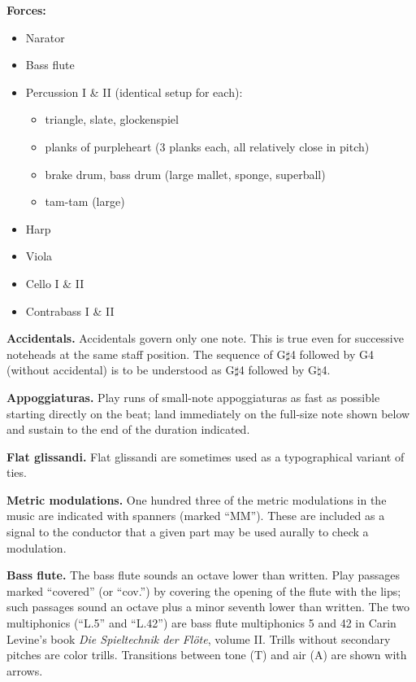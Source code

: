 \textbf{Forces:}

\begin{itemize} \itemsep2pt
\item Narator
\item Bass flute
\item Percussion I \& II (identical setup for each):
    \begin{itemize}
    \item triangle, slate, glockenspiel
    \item planks of purpleheart (3 planks each, all relatively close in pitch)
    \item brake drum, bass drum (large mallet, sponge, superball)
    \item tam-tam (large)
    \end{itemize}
\item Harp
\item Viola
\item Cello I \& II
\item Contrabass I \& II
\end{itemize}

\textbf{Accidentals.} Accidentals govern only one note. This is true even for
successive noteheads at the same staff position. The sequence of G$\sharp$4
followed by G4 (without accidental) is to be understood as G$\sharp$4 followed
by G$\natural$4.

\textbf{Appoggiaturas.} Play runs of small-note appoggiaturas as fast as
possible starting directly on the beat; land immediately on the full-size note
shown below and sustain to the end of the duration indicated.

\textbf{Flat glissandi.} Flat glissandi are sometimes used as a typographical
variant of ties.

\textbf{Metric modulations.} One hundred three of the metric modulations in the
music are indicated with spanners (marked ``MM''). These are included as a
signal to the conductor that a given part may be used aurally to check a
modulation.

\textbf{Bass flute.} The bass flute sounds an octave lower than written. Play
passages marked ``covered'' (or ``cov.'') by covering the opening of the flute
with the lips; such passages sound an octave plus a  minor seventh lower than
written. The two multiphonics (``L.5'' and ``L.42'') are bass flute
multiphonics 5 and 42 in Carin Levine's book \textit{Die Spieltechnik der
Fl\"{o}te}, volume II. Trills without secondary pitches are color trills.
Transitions between tone (T) and air (A) are shown with arrows.

